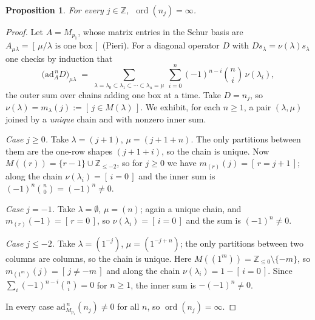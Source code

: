 \documentclass[11pt]{article}
\newtheorem{proposition}[theorem]{Proposition}
\theoremstyle{definition}
\DeclareMathOperator{\ord}{ord}
\newcommand{\Z}{\mathbb{Z}}
\newcommand{\Mult}[1]{M_{#1}}
\begin{document}
\begin{proposition}\label{prop:ordn}
For every $j\in\Z$, $\ \ord(n_j)=\infty$.
\end{proposition}

\begin{proof}
Let $A=\Mult{p_1}$, whose matrix entries in the Schur basis are
$A_{\mu\lambda}=[\,\mu/\lambda \text{ is one box}\,]$ (Pieri).  For a diagonal
operator $D$ with $D s_\lambda=\nu(\lambda)s_\lambda$ one checks by induction that
\[
 \bigl(\mathrm{ad}_A^{\,n}D\bigr)_{\mu\lambda}
 \;=\;\sum_{\lambda=\lambda_0\subset\lambda_1\subset\cdots\subset\lambda_n=\mu}
   \ \sum_{i=0}^{n}(-1)^{n-i}\binom{n}{i}\,\nu(\lambda_i),
\]
the outer sum over chains adding one box at a time.  Take $D=n_j$, so
$\nu(\lambda)=m_\lambda(j):=[\,j\in M(\lambda)\,]$.  We exhibit, for each $n\ge1$, a
pair $(\lambda,\mu)$ joined by a \emph{unique} chain and with nonzero inner sum.

\emph{Case $j\ge0$.}  Take $\lambda=(j+1)$, $\mu=(j+1+n)$.  The only partitions
between them are the one-row shapes $(j+1+i)$, so the chain is unique.  Now
$M((r))=\{r-1\}\cup\Z_{\le-2}$, so for $j\ge0$ we have $m_{(r)}(j)=[\,r=j+1\,]$;
along the chain $\nu(\lambda_i)=[\,i=0\,]$ and the inner sum is
$(-1)^{n}\binom{n}{0}=(-1)^n\neq0$.

\emph{Case $j=-1$.}  Take $\lambda=\emptyset$, $\mu=(n)$; again a unique chain, and
$m_{(r)}(-1)=[\,r=0\,]$, so $\nu(\lambda_i)=[\,i=0\,]$ and the sum is $(-1)^n\neq0$.

\emph{Case $j\le-2$.}  Take $\lambda=(1^{-j})$, $\mu=(1^{-j+n})$; the only
partitions between two columns are columns, so the chain is unique.  Here
$M((1^m))=\Z_{\le0}\setminus\{-m\}$, so $m_{(1^m)}(j)=[\,j\neq-m\,]$ and along the
chain $\nu(\lambda_i)=1-[\,i=0\,]$.  Since $\sum_i(-1)^{n-i}\binom{n}{i}=0$ for
$n\ge1$, the inner sum is $-(-1)^{n}\neq0$.

In every case $\mathrm{ad}_{\Mult{p_1}}^{\,n}(n_j)\neq0$ for all $n$, so
$\ord(n_j)=\infty$.
\end{proof}
\end{document}
